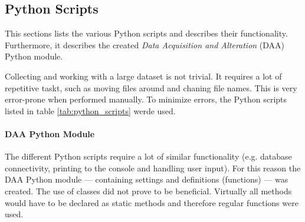 \subsection{Python Scripts}
\label{subsec:python_scripts}


This sections lists the various Python scripts and describes their functionality.
Furthermore, it describes the created \textit{Data Acquisition and Alteration} (DAA) Python module.

Collecting and working with a large dataset is not trivial.
It requires a lot of repetitive taskt, such as moving files around and chaning file names.
This is very error-prone when performed manually.
To minimize errors, the Python scripts listed in table \ref{tab:python_scripts} werde used.
\\

\paragraph{DAA Python Module}
The different Python scripts require a lot of similar functionality (e.g. database connectivity, printing to the console and handling user input).
For this reason the DAA Python module --- containing settings and definitions (functions) --- was created.
The use of classes did not prove to be beneficial.
Virtually all methods would have to be declared as static methods and therefore regular functions were used.

